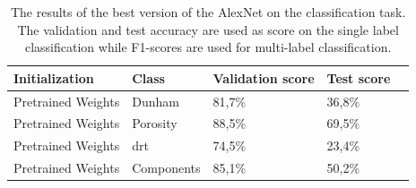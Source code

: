 \begin{table}
\caption[Scores of best performing AlexNet]{\label{tab:alexbest} The results of the best version of the AlexNet on the classification task. The validation and test accuracy are used as score on the single label classification while F1-scores are used for multi-label classification.}
\centering
\begin{tabular}[b]{| l | l | l | l | l |}
\hline
    Initialization & Class & Validation score & Test score  \\ \hline
    Pretrained Weights & Dunham &  81,7\%  & 36,8\% \\ \hline
    Pretrained Weights & Porosity & 88,5\%  &  69,5\% \\ \hline
    Pretrained Weights &\gls{drt} & 74,5\% &  23,4\% \\ \hline
    Pretrained Weights &Components & 85,1\% &  50,2\% \\ \hline
\end{tabular} 
\end{table}

